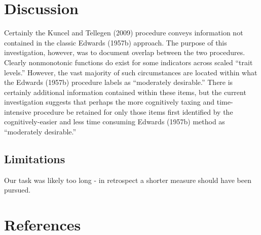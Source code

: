 \documentclass[
  english,
  ,jou]{apa6}
\begin{document}
\hypertarget{discussion-1}{%
\section{Discussion}\label{discussion-1}}

Certainly the Kuncel and Tellegen (2009) procedure conveys information not contained in the classic Edwards (1957b) approach. The purpose of this investigation, however, was to document overlap between the two procedures. Clearly nonmonotonic functions do exist for some indicators across scaled ``trait levels.'' However, the vast majority of such circumstances are located within what the Edwards (1957b) procedure labels as ``moderately desirable.'' There is certainly additional information contained within these items, but the current investigation suggests that perhaps the more cognitively taxing and time-intensive procedure be retained for only those items first identified by the cognitively-easier and less time consuming Edwards (1957b) method as ``moderately desirable.''

\hypertarget{limitations}{%
\subsection{Limitations}\label{limitations}}

Our task was likely too long - in retrospect a shorter measure should have been pursued.

\hypertarget{references}{%
\section{References}\label{references}}

\begingroup
\setlength{\parindent}{-0.5in}
\setlength{\leftskip}{0.5in}
\end{document}
